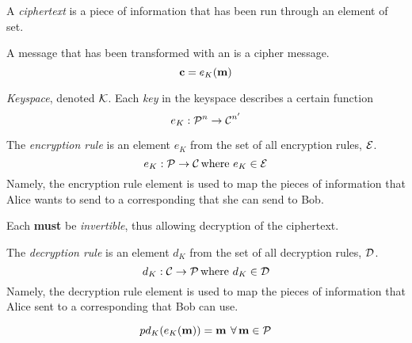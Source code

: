 \begin{definition}[Ciphertext]\label{def:Ciphertext}
  A \emph{ciphertext} is a piece of  information that has been run through an element of  set.

  A message that has been transformed with an  is a cipher message.
  \begin{equation}\label{eq:Ciphertext}
    \operatorname{\mathbf{c}} = e_{K} (\operatorname{\mathbf{m}})
  \end{equation}
\end{definition}

\begin{definition}[Keyspace]\label{def:Keyspace}
  \emph{Keyspace}, denoted $\operatorname{\mathcal{K}}$.
  Each \emph{key} in the keyspace describes a certain function
  \begin{equation}\label{eq:Keyspace}
    e_{K} : \operatorname{\mathcal{P}}^{n} \to \operatorname{\mathcal{C}}^{n'}
  \end{equation}
\end{definition}

\begin{definition}\label{def:Encryption_Rule}
  The \emph{encryption rule} is an element $e_{K}$ from the set of all encryption rules, $\operatorname{\mathcal{E}}$.
  \begin{equation}\label{eq:Encryption_Rule}
    e_{K} : \operatorname{\mathcal{P}} \to \operatorname{\mathcal{C}} \text{where } e_{K} \in \operatorname{\mathcal{E}}
  \end{equation}
  Namely, the encryption rule element is used to map the  pieces of information that Alice wants to send to a corresponding  that she can send to Bob.

  \begin{remark}[Invertible]\label{rmk:Encryption_Rule_Invertible}
    Each  \textbf{must} be \emph{invertible}, thus allowing decryption of the ciphertext.
  \end{remark}
\end{definition}

\begin{definition}\label{def:Decryption_Rule}
  The \emph{decryption rule} is an element $d_{K}$ from the set of all decryption rules, $\operatorname{\mathcal{D}}$.
  \begin{equation}\label{eq:Decryption_Rule}
    d_{K} : \operatorname{\mathcal{C}} \to \operatorname{\mathcal{P}} \text{where } d_{K} \in \operatorname{\mathcal{D}}
  \end{equation}
  Namely, the decryption rule element is used to map the  pieces of information that Alice sent to a corresponding  that Bob can use.

  \begin{remark}
    \begin{equation}\label{eq:Decrypt_Encryption}
p      d_{K}(e_{K}(\operatorname{\mathbf{m}})) = \operatorname{\mathbf{m}} \: \forall \operatorname{\mathbf{m}} \in \operatorname{\mathcal{P}}
    \end{equation}
  \end{remark}
\end{definition}

